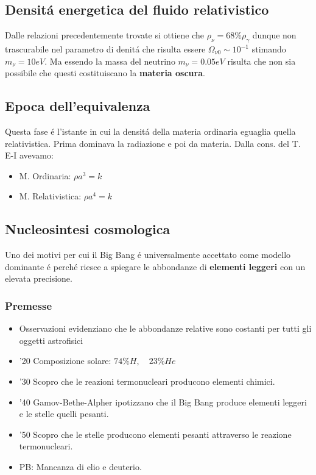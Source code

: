 \documentclass[12pt, a4paper]{article}
\begin{document}
\subsection{Densit\'{a} energetica del fluido relativistico}
Dalle relazioni precedentemente trovate si ottiene che $\rho_{\nu}=68\% \rho_{\gamma}$ dunque non trascurabile nel parametro di denit\'{a} che risulta essere $\Omega_{\nu0}\sim 10^{-1}$ stimando $m_{\nu}=10eV$. Ma essendo la massa del neutrino $m_{\nu}=0.05eV$ risulta che non sia possibile che questi costituiscano la \textbf{materia oscura}.
\subsection{Epoca dell'equivalenza}
Questa fase \'{e} l'istante in cui la densit\'{a} della materia ordinaria eguaglia quella relativistica. Prima dominava la radiazione e poi da materia. Dalla cons. del T. E-I avevamo:
\begin{itemize}
    \item M. Ordinaria: $\rho a^3=k$
    \item M. Relativistica: $\rho a^4=k$
\end{itemize}
\subsection{Nucleosintesi cosmologica}
Uno dei motivi per cui il Big Bang \'{e} universalmente accettato come modello dominante \'{e} perch\'{e} riesce a spiegare le abbondanze di \textbf{elementi leggeri} con un elevata precisione.
\subsubsection{Premesse}
\begin{itemize}
    \item Osservazioni evidenziano che le abbondanze relative sono costanti per tutti gli oggetti astrofisici
    \item '20 Composizione solare: $74\% H, \quad 23\% He$
    \item '30 Scopro che le reazioni termonucleari producono elementi chimici.
    \item '40 Gamov-Bethe-Alpher ipotizzano che il Big Bang produce elementi leggeri e le stelle quelli pesanti.
    \item '50 Scopro che le stelle producono elementi pesanti attraverso le reazione termonucleari.
    \item PB: Mancanza di elio e deuterio.
\end{itemize}
\end{document}
